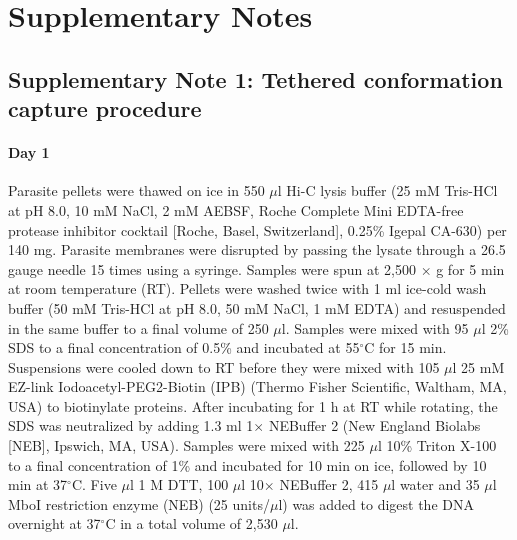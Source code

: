 


\section*{Supplementary Notes}

\subsection*{Supplementary Note 1: Tethered conformation capture procedure}
\label{supp:ourHiC}
\paragraph{Day 1}
 Parasite pellets were thawed on
ice in 550 $\mu$l Hi-C lysis buffer (25 mM Tris-HCl at pH 8.0, 10 mM NaCl,
2 mM AEBSF, Roche Complete Mini EDTA-free protease inhibitor cocktail
[Roche, Basel, Switzerland], 0.25\% Igepal CA-630) per 140
mg. Parasite membranes were disrupted by passing the lysate through a
26.5 gauge needle 15 times using a syringe. Samples were spun at 2,500
$\times$ g for 5 min at room temperature (RT). Pellets were washed twice with
1 ml ice-cold wash buffer (50 mM Tris-HCl at pH 8.0, 50 mM NaCl, 1 mM
EDTA) and resuspended in the same buffer to a final volume of 250
$\mu$l. Samples were mixed with 95 $\mu$l 2\% SDS to a final concentration of
0.5\% and incubated at 55$^\circ$C for 15 min. Suspensions were cooled down
to RT before they were mixed with 105 $\mu$l 25 mM EZ-link
Iodoacetyl-PEG2-Biotin (IPB) (Thermo Fisher Scientific, Waltham, MA,
USA) to biotinylate proteins. After incubating for 1 h at RT while
rotating, the SDS was neutralized by adding 1.3 ml 1$\times$ NEBuffer 2 (New
England Biolabs [NEB], Ipswich, MA, USA). Samples were mixed with 225
$\mu$l 10\% Triton X-100 to a final concentration of 1\% and incubated for
10 min on ice, followed by 10 min at 37$^\circ$C. Five $\mu$l 1 M DTT, 100 $\mu$l 10$\times$
NEBuffer 2, 415 $\mu$l water and 35 $\mu$l MboI restriction enzyme (NEB) (25
units/$\mu$l) was added to digest the DNA overnight at 37$^\circ$C in a total
volume of 2,530 $\mu$l.

